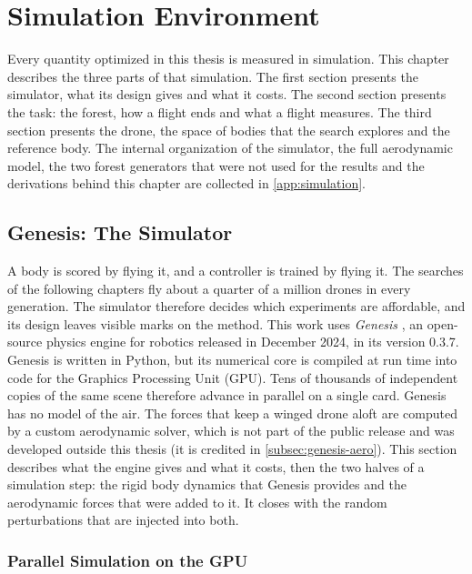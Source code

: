 \chapter{Simulation Environment}
\label{ch:environment}

Every quantity optimized in this thesis is measured in simulation. This chapter describes the three parts of that simulation. The first section presents the simulator, what its design gives and what it costs. The second section presents the task: the forest, how a flight ends and what a flight measures. The third section presents the drone, the space of bodies that the search explores and the reference body. The internal organization of the simulator, the full aerodynamic model, the two forest generators that were not used for the results and the derivations behind this chapter are collected in \autoref{app:simulation}.

\section{Genesis: The Simulator}
\label{sec:genesis}

A body is scored by flying it, and a controller is trained by flying it. The searches of the following chapters fly about a quarter of a million drones in every generation. The simulator therefore decides which experiments are affordable, and its design leaves visible marks on the method. This work uses \emph{Genesis} \cite{genesis2024}, an open-source physics engine for robotics released in December 2024, in its version 0.3.7. Genesis is written in Python, but its numerical core is compiled at run time into code for the Graphics Processing Unit (GPU). Tens of thousands of independent copies of the same scene therefore advance in parallel on a single card. Genesis has no model of the air. The forces that keep a winged drone aloft are computed by a custom aerodynamic solver, which is not part of the public release and was developed outside this thesis (it is credited in \autoref{subsec:genesis-aero}). This section describes what the engine gives and what it costs, then the two halves of a simulation step: the rigid body dynamics that Genesis provides and the aerodynamic forces that were added to it. It closes with the random perturbations that are injected into both.

\subsection{Parallel Simulation on the GPU}
\label{subsec:genesis-proscons}

